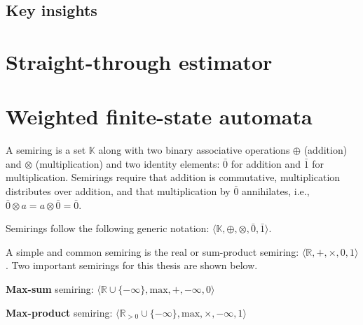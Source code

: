 \subsection{Key insights}

\section{Straight-through estimator}

\section{Weighted finite-state automata}

\label{wfsa}

\begin{definition}
  A semiring is a set $\mathbb{K}$ along with two binary associative operations $\oplus$ (addition) and $\otimes$ (multiplication) and two identity elements: $\bar{0}$ for addition and $\bar{1}$ for multiplication. Semirings require that addition is commutative, multiplication distributes over addition, and that multiplication by $\bar{0}$ annihilates, i.e., $\bar{0} \otimes a = a \otimes \bar{0} = \bar{0}$.

\begin{remark}
  Semirings follow the following generic notation: $\langle \mathbb{K}, \oplus, \otimes, \bar{0}, \bar{1} \rangle$.
\end{remark}

\begin{remark}
  A simple and common semiring is the real or sum-product semiring: $\langle \mathbb{R}, +, \times, 0, 1 \rangle$. Two important semirings for this thesis are shown below.
\end{remark}

\begin{remark}
  \textbf{Max-sum} semiring: $\langle \mathbb{R} \cup \{-\infty\}, \text{max}, +, -\infty, 0 \rangle$
\end{remark}

\begin{remark}
  \textbf{Max-product} semiring: $\langle \mathbb{R}_{>0} \cup \{-\infty\}, \text{max}, \times, -\infty, 1 \rangle$
\end{remark}

\end{definition}

